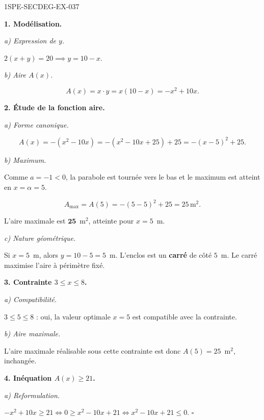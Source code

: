 \begin{corrige}{1SPE-SECDEG-EX-037}

\textbf{1. Modélisation.}

\textit{a) Expression de $y$.}


$2(x + y) = 20 \implies y = 10 - x$.

\textit{b) Aire $A(x)$.}

\[A(x) = x \cdot y = x(10 - x) = -x^2 + 10x.\]

\medskip
\textbf{2. Étude de la fonction aire.}

\textit{a) Forme canonique.}


\[A(x) = -(x^2 - 10x) = -(x^2 - 10x + 25) + 25 = -(x-5)^2 + 25.\]

\textit{b) Maximum.}

Comme $a = -1 < 0$, la parabole est tournée vers le bas et le maximum est atteint en $x = \alpha = 5$.

\[A_{\max} = A(5) = -(5-5)^2 + 25 = 25\,\text{m}^2.\]

L'aire maximale est $\mathbf{25}$~m$^2$, atteinte pour $x = 5$~m.

\textit{c) Nature géométrique.}

Si $x = 5$~m, alors $y = 10 - 5 = 5$~m. L'enclos est un \textbf{carré} de côté $5$~m. Le carré maximise l'aire à périmètre fixé.

\medskip
\textbf{3. Contrainte $3 \leqslant x \leqslant 8$.}

\textit{a) Compatibilité.}


$3 \leqslant 5 \leqslant 8$ : oui, la valeur optimale $x = 5$ est compatible avec la contrainte.

\textit{b) Aire maximale.}

L'aire maximale réalisable sous cette contrainte est donc $A(5) = 25$~m$^2$, inchangée.

\medskip
\textbf{4. Inéquation $A(x) \geqslant 21$.}

\textit{a) Reformulation.}


$-x^2 + 10x \geqslant 21 \iff 0 \geqslant x^2 - 10x + 21 \iff x^2 - 10x + 21 \leqslant 0$. \hfill $\square$


\end{corrige}
